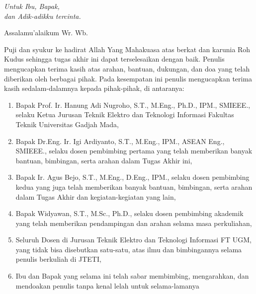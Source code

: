 \documentclass{jtetiskripsi}
\begin{document}
\cover

\approvalpage

\acknowledgment
\begin{flushright}
\emph{Untuk Ibu, Bapak,\\dan Adik-adikku tercinta.}
\end{flushright}



\preface
Assalamu'alaikum Wr. Wb.

\vspace{0.5cm}

Puji dan syukur ke hadirat Allah Yang Mahakuasa atas berkat dan karunia Roh Kudus sehingga tugas akhir ini dapat terselesaikan dengan baik. Penulis mengucapkan terima kasih atas arahan, bantuan, dukungan, dan doa yang telah diberikan oleh berbagai pihak. Pada kesempatan ini penulis mengucapkan terima kasih sedalam-dalamnya kepada pihak-pihak, di antaranya:

\begin{enumerate}
\item{Bapak Prof. Ir. Hanung Adi Nugroho, S.T., M.Eng., Ph.D., IPM., SMIEEE., selaku Ketua Jurusan Teknik Elektro dan Teknologi Informasi Fakultas Teknik Universitas Gadjah Mada,}
\item{Bapak Dr.Eng. Ir. Igi Ardiyanto, S.T., M.Eng., IPM., ASEAN Eng., SMIEEE., selaku dosen pembimbing pertama yang telah memberikan banyak bantuan, bimbingan, serta arahan dalam Tugas Akhir ini,}
\item{Bapak Ir. Agus Bejo, S.T., M.Eng., D.Eng., IPM., selaku dosen pembimbing kedua yang juga telah memberikan banyak bantuan, bimbingan, serta arahan dalam Tugas Akhir dan kegiatan-kegiatan yang lain,}
\item{Bapak Widyawan, S.T., M.Sc., Ph.D., selaku dosen pembimbing akademik yang telah memberikan pendampingan dan arahan selama masa perkuliahan,}
\item{Seluruh Dosen di Jurusan Teknik Elektro dan Teknologi Informasi FT UGM, yang tidak bisa disebutkan satu-satu, atas ilmu dan bimbingannya selama penulis berkuliah di JTETI,}
\item{Ibu dan Bapak yang selama ini telah sabar membimbing, mengarahkan, dan mendoakan penulis tanpa kenal lelah untuk selama-lamanya}
\end{enumerate}
\end{document}

